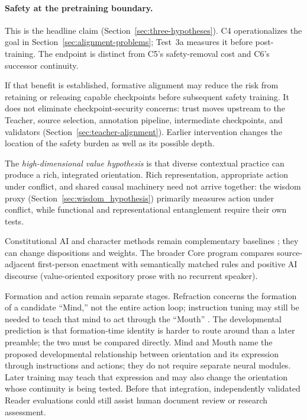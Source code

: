 \documentclass[11pt]{article}
\begin{document}
\paragraph{Safety at the pretraining boundary.} This is the headline claim
(Section~\ref{sec:three-hypotheses}). C4 operationalizes the goal in
Section~\ref{sec:alignment-problems}; Test~3a measures it before
post-training. The endpoint is distinct from C5's safety-removal cost and
C6's successor continuity.

If that benefit is established, formative alignment may reduce the risk from
retaining or releasing capable checkpoints before subsequent safety training.
It does not eliminate checkpoint-security concerns: trust moves upstream to
the Teacher, source selection, annotation pipeline, intermediate checkpoints,
and validators (Section~\ref{sec:teacher-alignment}). Earlier intervention
changes the location of the safety burden as well as its possible depth.

		The \emph{high-dimensional value hypothesis} is that diverse contextual
practice can produce a rich, integrated orientation. Rich representation,
appropriate action under conflict, and shared causal machinery need not arrive
together: the wisdom proxy (Section~\ref{sec:wisdom_hypothesis}) primarily
measures action under conflict, while
functional and representational entanglement require their own tests.

			Constitutional AI and character methods remain complementary baselines
\cite{bai2022constitutional}; they can change dispositions and weights. The
broader Core program compares source-adjacent first-person enactment with
semantically matched rules and positive AI discourse (value-oriented
expository prose with no recurrent speaker).

			Formation and action remain separate stages. Refraction concerns the
			formation of a candidate ``Mind,'' not the entire action loop; instruction
			tuning may still be needed to teach that mind to act through the ``Mouth''
			\cite{wei2021finetuned}. The developmental prediction is that
			formation-time identity is harder to route around than a later preamble;
			the two must be compared directly. Mind and Mouth name the proposed
developmental relationship between orientation and its expression through
instructions and actions; they do not require separate neural modules. Later
training may teach that expression and may also change the orientation whose
continuity is being tested.
Before that integration, independently validated Reader evaluations could
still assist human document review or research assessment.
\end{document}
